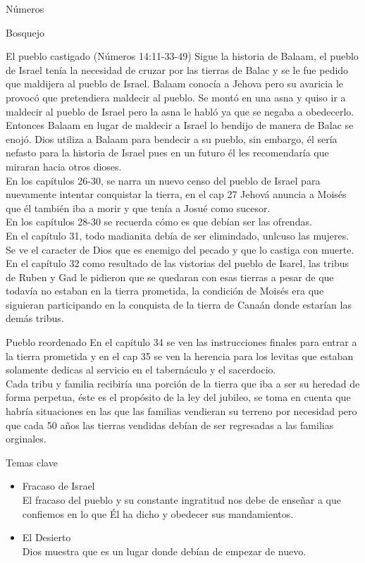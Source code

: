 \begin{section}{Números}
\begin{subsection}{Bosquejo}
\begin{subsubsection}{El pueblo castigado (Números 14:11-33-49)}
			Sigue la historia de Balaam, el pueblo de Israel tenía la necesidad de cruzar por las tierras de Balac y se le fue pedido que maldijera al pueblo de Israel. Balaam conocía a Jehova pero su avaricia le provocó que pretendiera maldecir al pueblo. Se montó en una asna y quiso ir a maldecir al pueblo de Israel pero la asna le habló ya que se negaba a obedecerlo. Entonces Balaam en lugar de maldecir a Israel lo bendijo de manera de Balac se enojó. Dios utiliza a Balaam para bendecir a su pueblo, sin embargo, él sería nefasto para la historia de Israel pues en un futuro él les recomendaría que miraran hacia otros dioses.\\
			En los capítulos 26-30, se narra un nuevo censo del pueblo de Israel para nuevamente intentar conquistar la tierra, en el cap 27 Jehová anuncia a Moisés que él también iba a morir y que tenía a Josué como sucesor.\\
			En los capítulos 28-30 se recuerda cómo es que debían ser las ofrendas.\\
			 En el capítulo 31, todo madianita debía de ser elimindado, unlcuso las mujeres. Se ve el caracter de Dios que es enemigo del pecado y que lo castiga con muerte.\newpage
			 En el capítulo 32 como resultado de las vistorias del pueblo de Isarel, las tribus de Ruben y Gad le pidieron que se quedaran con esas tierras a pesar de que todavía no estaban en la tierra prometida, la condición de Moisés era que siguieran participando en la conquista de la tierra de Canaán donde estarían las demás tribus.
		\end{subsubsection}
		\begin{subsubsection}{Pueblo reordenado}
			En el capítulo 34 se ven las instrucciones finales para entrar a la tierra prometida y en el cap 35 se ven la herencia para los levitas que estaban solamente dedicas al servicio en el tabernáculo y el sacerdocio.\\
			Cada tribu y familia recibiría una porción de la tierra que iba a ser su heredad de forma perpetua, éste es el propósito de la ley del jubileo, se toma en cuenta que habría situaciones en las que las familias vendieran su terreno por necesidad pero que cada 50 años las tierras vendidas debían de ser regresadas a las familias orginales.
			
		\end{subsubsection}
		\begin{subsubsection}{Temas clave}
			\begin{itemize}
				\item Fracaso de Israel\\
					El fracaso del pueblo y su constante ingratitud nos debe de enseñar a que confiemos en lo que Él ha dicho y obedecer sus mandamientos.
				\item El Desierto\\
					Dios muestra que es un lugar donde debían de empezar de nuevo.
			\end{itemize}	


\end{subsubsection}
\end{subsection}
\end{section}
